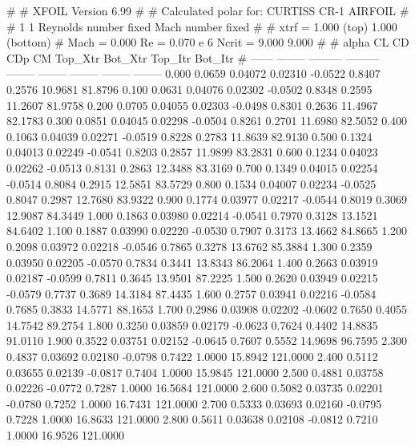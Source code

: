 #  
#       XFOIL         Version 6.99
#  
# Calculated polar for: CURTISS CR-1 AIRFOIL                            
#  
# 1 1 Reynolds number fixed          Mach number fixed         
#  
# xtrf =   1.000 (top)        1.000 (bottom)  
# Mach =   0.000     Re =     0.070 e 6     Ncrit =   9.000  9.000
#  
#   alpha    CL        CD       CDp       CM     Top_Xtr  Bot_Xtr  Top_Itr  Bot_Itr
#  ------ -------- --------- --------- -------- -------- -------- -------- --------
   0.000   0.0659   0.04072   0.02310  -0.0522   0.8407   0.2576  10.9681  81.8796
   0.100   0.0631   0.04076   0.02302  -0.0502   0.8348   0.2595  11.2607  81.9758
   0.200   0.0705   0.04055   0.02303  -0.0498   0.8301   0.2636  11.4967  82.1783
   0.300   0.0851   0.04045   0.02298  -0.0504   0.8261   0.2701  11.6980  82.5052
   0.400   0.1063   0.04039   0.02271  -0.0519   0.8228   0.2783  11.8639  82.9130
   0.500   0.1324   0.04013   0.02249  -0.0541   0.8203   0.2857  11.9899  83.2831
   0.600   0.1234   0.04023   0.02262  -0.0513   0.8131   0.2863  12.3488  83.3169
   0.700   0.1349   0.04015   0.02254  -0.0514   0.8084   0.2915  12.5851  83.5729
   0.800   0.1534   0.04007   0.02234  -0.0525   0.8047   0.2987  12.7680  83.9322
   0.900   0.1774   0.03977   0.02217  -0.0544   0.8019   0.3069  12.9087  84.3449
   1.000   0.1863   0.03980   0.02214  -0.0541   0.7970   0.3128  13.1521  84.6402
   1.100   0.1887   0.03990   0.02220  -0.0530   0.7907   0.3173  13.4662  84.8665
   1.200   0.2098   0.03972   0.02218  -0.0546   0.7865   0.3278  13.6762  85.3884
   1.300   0.2359   0.03950   0.02205  -0.0570   0.7834   0.3441  13.8343  86.2064
   1.400   0.2663   0.03919   0.02187  -0.0599   0.7811   0.3645  13.9501  87.2225
   1.500   0.2620   0.03949   0.02215  -0.0579   0.7737   0.3689  14.3184  87.4435
   1.600   0.2757   0.03941   0.02216  -0.0584   0.7685   0.3833  14.5771  88.1653
   1.700   0.2986   0.03908   0.02202  -0.0602   0.7650   0.4055  14.7542  89.2754
   1.800   0.3250   0.03859   0.02179  -0.0623   0.7624   0.4402  14.8835  91.0110
   1.900   0.3522   0.03751   0.02152  -0.0645   0.7607   0.5552  14.9698  96.7595
   2.300   0.4837   0.03692   0.02180  -0.0798   0.7422   1.0000  15.8942 121.0000
   2.400   0.5112   0.03655   0.02139  -0.0817   0.7404   1.0000  15.9845 121.0000
   2.500   0.4881   0.03758   0.02226  -0.0772   0.7287   1.0000  16.5684 121.0000
   2.600   0.5082   0.03735   0.02201  -0.0780   0.7252   1.0000  16.7431 121.0000
   2.700   0.5333   0.03693   0.02160  -0.0795   0.7228   1.0000  16.8633 121.0000
   2.800   0.5611   0.03638   0.02108  -0.0812   0.7210   1.0000  16.9526 121.0000
